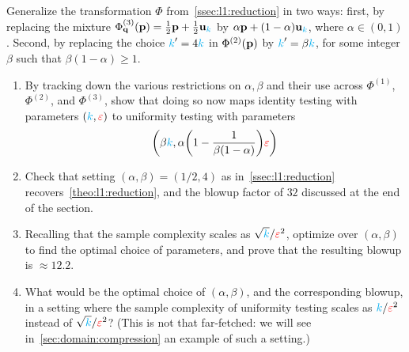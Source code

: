 \begin{question}[$\star\star$]\label{ex:l1:reduction:parameters}
Generalize the transformation $\Phi$ from~\cref{ssec:l1:reduction} in two ways: first, by replacing the mixture $\Phi^{(3)}_{\mathbf{q}}(\mathbf{p}) = \frac{1}{2}\mathbf{p}+\frac{1}{2}\mathbf{u}_{ {\textcolor{cyan}{k}} } $ by $\alpha\mathbf{p}+(1-\alpha)\mathbf{u}_{ {\textcolor{cyan}{k}} } $, where $\alpha\in(0,1)$. Second, by replacing the choice ${\textcolor{cyan}{k}}'=4{\textcolor{cyan}{k}}$ in $\Phi^{(2)}(\mathbf{p})$ by ${\textcolor{cyan}{k}}'=\beta{\textcolor{cyan}{k}}$, for some integer $\beta$ such that $\beta(1-\alpha)\geq 1$.
\begin{enumerate}
  \item By tracking down the various restrictions on $\alpha,\beta$ and their use across $\Phi^{(1)}$, $\Phi^{(2)}$, and $\Phi^{(3)}$, show that doing so now maps identity testing with parameters $({\textcolor{cyan}{k}},\textcolor{red}{\varepsilon})$ to uniformity testing with parameters 
  \[
  	\Paren{\beta\ab,\alpha\Paren{1-\frac{1}{\beta(1-\alpha)}}\dst}
  \]
  \item Check that setting $(\alpha,\beta)=(1/2,4)$ as in~\cref{ssec:l1:reduction} recovers~\cref{theo:l1:reduction}, and the blowup factor of $32$ discussed at the end of the section.
  \item Recalling that the sample complexity scales as $\sqrt{{\textcolor{cyan}{k}}}/\textcolor{red}{\varepsilon}^2$, optimize over $(\alpha,\beta)$ to find the optimal choice of parameters, and prove that the resulting blowup is $\approx 12.2$. %
  \item What would be the optimal choice of $(\alpha,\beta)$, and the corresponding blowup, in a setting where the sample complexity of uniformity testing scales as ${\textcolor{cyan}{k}}/\textcolor{red}{\varepsilon}^2$ instead of $\sqrt{{\textcolor{cyan}{k}}}/\textcolor{red}{\varepsilon}^2$? (This is not that far-fetched: we will see in~\cref{sec:domain:compression} an example of such a setting.)  %
\end{enumerate}
\end{question}
